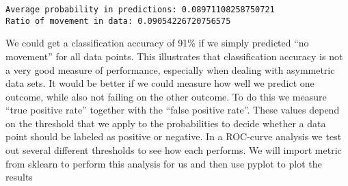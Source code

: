 \documentclass[a4paper,10pt, landscape]{article}
\begin{document}
    \begin{Verbatim}[commandchars=\\\{\}]
Average probability in predictions: 0.08971108258750721
Ratio of movement in data: 0.09054226720756575

    \end{Verbatim}

    We could get a classification accuracy of 91\% if we simply predicted
``no movement'' for all data points. This illustrates that
classification accuracy is not a very good measure of performance,
especially when dealing with asymmetric data sets. It would be better if
we could measure how well we predict one outcome, while also not failing
on the other outcome. To do this we measure ``true positive rate''
together with the ``false positive rate''. These values depend on the
threshold that we apply to the probabilities to decide whether a data
point should be labeled as positive or negative. In a ROC-curve analysis
we test out several different thresholds to see how each performs. We
will import metric from sklearn to perform this analysis for us and then
use pyplot to plot the results
\end{document}
